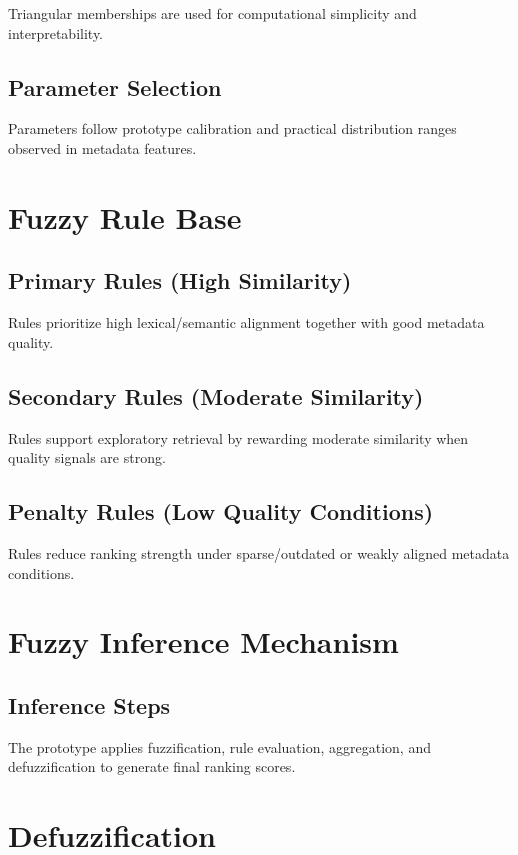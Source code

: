 \documentclass[11pt,a4paper]{article}
\begin{document}
Triangular memberships are used for computational simplicity and interpretability.

\subsection{Parameter Selection}

Parameters follow prototype calibration and practical distribution ranges observed in metadata features.

\section{Fuzzy Rule Base}

\subsection{Primary Rules (High Similarity)}

Rules prioritize high lexical/semantic alignment together with good metadata quality.

\subsection{Secondary Rules (Moderate Similarity)}

Rules support exploratory retrieval by rewarding moderate similarity when quality signals are strong.

\subsection{Penalty Rules (Low Quality Conditions)}

Rules reduce ranking strength under sparse/outdated or weakly aligned metadata conditions.

\section{Fuzzy Inference Mechanism}

\subsection{Inference Steps}

The prototype applies fuzzification, rule evaluation, aggregation, and defuzzification to generate final ranking scores.

\section{Defuzzification}
\end{document}

